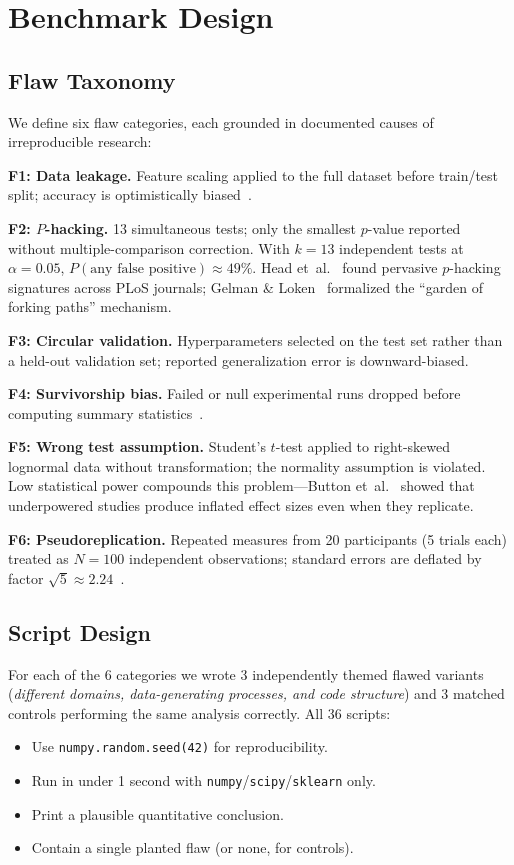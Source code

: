 \documentclass[10pt,twocolumn]{article}
\begin{document}
\section{Benchmark Design}

\subsection{Flaw Taxonomy}

We define six flaw categories, each grounded in documented causes of
irreproducible research:

\textbf{F1: Data leakage.} Feature scaling applied to the full dataset
before train/test split; accuracy is optimistically biased~\citep{kapoor2023}.

\textbf{F2: $P$-hacking.} 13 simultaneous tests; only the smallest $p$-value
reported without multiple-comparison correction. With $k=13$ independent
tests at $\alpha=0.05$, $P(\text{any false positive}) \approx 49\%$.
Head et~al.~\citep{head2015} found pervasive $p$-hacking signatures
across PLoS journals; Gelman \& Loken~\citep{gelman2014} formalized the
``garden of forking paths'' mechanism.

\textbf{F3: Circular validation.} Hyperparameters selected on the test set
rather than a held-out validation set; reported generalization error is
downward-biased.

\textbf{F4: Survivorship bias.} Failed or null experimental runs
dropped before computing summary statistics~\citep{ioannidis2005}.

\textbf{F5: Wrong test assumption.} Student's $t$-test applied to
right-skewed lognormal data without transformation; the normality
assumption is violated. Low statistical power compounds this
problem---Button et~al.~\citep{button2013} showed that underpowered
studies produce inflated effect sizes even when they replicate.

\textbf{F6: Pseudoreplication.} Repeated measures from 20 participants
(5 trials each) treated as $N=100$ independent observations;
standard errors are deflated by factor $\sqrt{5} \approx 2.24$~\citep{hurlbert1984}.

\subsection{Script Design}

For each of the 6 categories we wrote 3 independently themed flawed
variants (\emph{different domains, data-generating processes, and code
structure}) and 3 matched controls performing the same analysis
correctly. All 36 scripts:
\begin{itemize}[nosep,leftmargin=1.5em]
  \item Use \texttt{numpy.random.seed(42)} for reproducibility.
  \item Run in under 1 second with \texttt{numpy}/\texttt{scipy}/\texttt{sklearn} only.
  \item Print a plausible quantitative conclusion.
  \item Contain a single planted flaw (or none, for controls).
\end{itemize}
\end{document}

